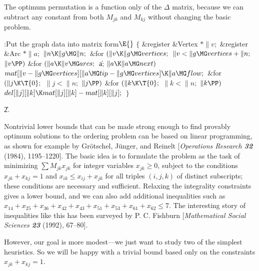 The optimum permutation is a function only of the $\Delta$ matrix, because
we can subtract any constant from both $M_{jk}$ and $M_{kj}$ without changing
the basic problem.

\Y\B\4:Put the graph data into matrix form\X${}\E{}$\6
${}\{{}$\5
\1\&{register} \&{Vertex} ${}{*}\|v;{}$\6
\&{register} \&{Arc} ${}{*}\|a;{}$\7
${}\|n\K\|g\MG\|n;{}$\6
\&{for} ${}(\|v\K\|g\MG\\{vertices};{}$ ${}\|v<\|g\MG\\{vertices}+\|n;{}$ ${}%
\|v\PP){}$\1\6
\&{for} ${}(\|a\K\|v\MG\\{arcs};{}$ \|a; ${}\|a\K\|a\MG\\{next}){}$\1\5
${}\\{mat}[\|v-\|g\MG\\{vertices}][\|a\MG\\{tip}-\|g\MG\\{vertices}]\K\|a\MG%
\\{flow};{}$\2\2\6
\&{for} ${}(\|j\K\T{0};{}$ ${}\|j<\|n;{}$ ${}\|j\PP){}$\1\6
\&{for} ${}(\|k\K\T{0};{}$ ${}\|k<\|n;{}$ ${}\|k\PP){}$\1\5
${}\\{del}[\|j][\|k]\K\\{mat}[\|j][\|k]-\\{mat}[\|k][\|j];{}$\2\2\6
\4${}\}{}$\2\par
\U2.\fi

Nontrivial lower bounds that can be made strong enough to find provably
optimum solutions to the ordering problem can be based on linear programming,
as shown for example by Gr\"otschel, J\"unger, and Reinelt
[{\sl Operations Research \bf32} (1984), 1195--1220].
The basic idea is to formulate the problem as
the task of minimizing $\sum M_{jk}x_{jk}$ for integer variables $x_{jk}\ge0$,
subject to the conditions $x_{jk}+x_{kj}=1$ and $x_{ik}\le x_{ij}+x_{jk}$
for all triples $(i,j,k)$ of distinct subscripts; these conditions are
necessary and sufficient. Relaxing the integrality constraints gives a
lower bound, and we can also add additional inequalities such as
$x_{14}+x_{25}+x_{36}+x_{42}+x_{43}+x_{51}+x_{53}+x_{61}+x_{62}\le7$.
The interesting story of inequalities like this has been surveyed by
P. C. Fishburn [{\sl Mathematical Social Sciences\/ \bf23} (1992), 67--80].

However, our goal is more modest---we just want
to study two of the simplest heuristics. So we will be happy with a trivial
bound based only on the constraints $x_{jk}+x_{kj}=1$.

